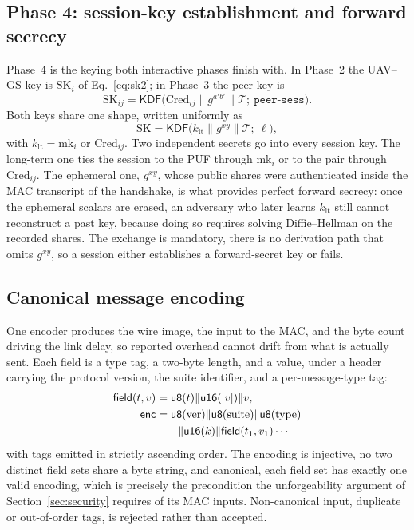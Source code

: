 \documentclass[journal]{IEEEtran}
\begin{document}
\subsection{Phase 4: session-key establishment and forward secrecy}
\label{sec:p4}

Phase~4 is the keying both interactive phases finish with. In Phase~2 the
UAV--GS key is $\text{SK}_i$ of Eq.~\eqref{eq:sk2}; in Phase~3 the peer key is
\begin{equation}
\text{SK}_{ij} = \mathsf{KDF}\big(\text{Cred}_{ij} \| g^{a'b'} \| \mathcal{T};\ \texttt{peer-sess}\big).
\label{eq:sk3}
\end{equation}
Both keys share one shape, written uniformly as
\begin{equation}
\text{SK} = \mathsf{KDF}\big(k_{\text{lt}} \| g^{xy} \| \mathcal{T};\ \ell\big),
\label{eq:sk}
\end{equation}
with $k_{\text{lt}} = \text{mk}_i$ or $\text{Cred}_{ij}$. Two independent
secrets go into every session key. The long-term one ties the session to the
PUF through $\text{mk}_i$ or to the pair through $\text{Cred}_{ij}$. The
ephemeral one, $g^{xy}$, whose public shares were authenticated inside the MAC
transcript of the handshake, is what provides perfect forward secrecy: once the
ephemeral scalars are erased, an adversary who later learns $k_{\text{lt}}$
still cannot reconstruct a past key, because doing so requires solving
Diffie--Hellman on the recorded shares. The exchange is mandatory, there is no
derivation path that omits $g^{xy}$, so a session either establishes a
forward-secret key or fails.

\subsection{Canonical message encoding}

One encoder produces the wire image, the input to the MAC, and the byte count
driving the link delay, so reported overhead cannot drift from what is actually
sent. Each field is a type tag, a two-byte length, and a value, under a header
carrying the protocol version, the suite identifier, and a per-message-type
tag:
\begin{align}
\mathsf{field}(t,v) &= \mathsf{u8}(t) \| \mathsf{u16}(|v|) \| v,\\
\mathsf{enc} &= \mathsf{u8}(\text{ver}) \| \mathsf{u8}(\text{suite}) \| \mathsf{u8}(\text{type}) \notag\\
&\qquad \| \mathsf{u16}(k) \| \mathsf{field}(t_1,v_1)\cdots
\end{align}
with tags emitted in strictly ascending order. The encoding is injective, no two
distinct field sets share a byte string, and canonical, each field set has
exactly one valid encoding, which is precisely the precondition the
unforgeability argument of Section~\ref{sec:security} requires of its MAC
inputs. Non-canonical input, duplicate or out-of-order tags, is rejected rather
than accepted.
\end{document}
